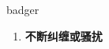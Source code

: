 
\begin{frame}
{\huge badger}
\begin{center}
\begin{enumerate}\Large
  \item \textbf{不断纠缠或骚扰}
\end{enumerate}
\end{center}
\end{frame}
